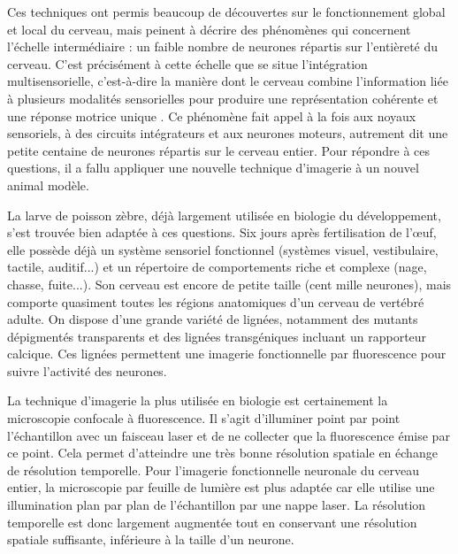 Ces techniques ont permis beaucoup de découvertes sur le fonctionnement global et local du cerveau, mais peinent à décrire des phénomènes qui concernent l'échelle intermédiaire : un faible nombre de neurones répartis sur l'entièreté du cerveau. C'est précisément à cette échelle que se situe l'intégration multisensorielle, c'est-à-dire la manière dont le cerveau combine l'information liée à plusieurs modalités sensorielles pour produire une représentation cohérente et une réponse motrice unique \cite{stein_multisensory_2008}. Ce phénomène fait appel à la fois aux noyaux sensoriels, à des circuits intégrateurs et aux neurones moteurs, autrement dit une petite centaine de neurones répartis sur le cerveau entier. Pour répondre à ces questions, il a fallu appliquer une nouvelle technique d'imagerie à un nouvel animal modèle.

La larve de poisson zèbre, déjà largement utilisée en biologie du développement, s'est trouvée bien adaptée à ces questions. Six jours après fertilisation de l’œuf, elle possède déjà un système sensoriel fonctionnel (systèmes visuel, vestibulaire, tactile, auditif...) et un répertoire de comportements riche et complexe (nage, chasse, fuite...). Son cerveau est encore de petite taille (cent mille neurones), mais comporte quasiment toutes les régions anatomiques d'un cerveau de vertébré adulte. On dispose d'une grande variété de lignées, notamment des mutants dépigmentés transparents et des lignées transgéniques incluant un rapporteur calcique. Ces lignées permettent une imagerie fonctionnelle par fluorescence pour suivre l'activité des neurones.

La technique d'imagerie la plus utilisée en biologie est certainement la microscopie confocale à fluorescence. Il s'agit d'illuminer point par point l'échantillon avec un faisceau laser et de ne collecter que la fluorescence émise par ce point. Cela permet d'atteindre une très bonne résolution spatiale en échange de résolution temporelle. Pour l'imagerie fonctionnelle neuronale du cerveau entier, la microscopie par feuille de lumière est plus adaptée car elle utilise une illumination plan par plan de l'échantillon par une nappe laser. La résolution temporelle est donc largement augmentée tout en conservant une résolution spatiale suffisante, inférieure à la taille d'un neurone. 


